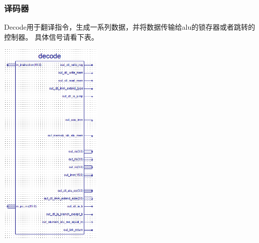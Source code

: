 \subsubsection{译码器}
Decode用于翻译指令，生成一系列数据，并将数据传输给alu的锁存器或者跳转的控制器。
具体信号请看下表。

\begin{center}
    \includegraphics[height=10cm]{image/detail/detail_decode.png}
    \label{fig:decode}
\end{center}
